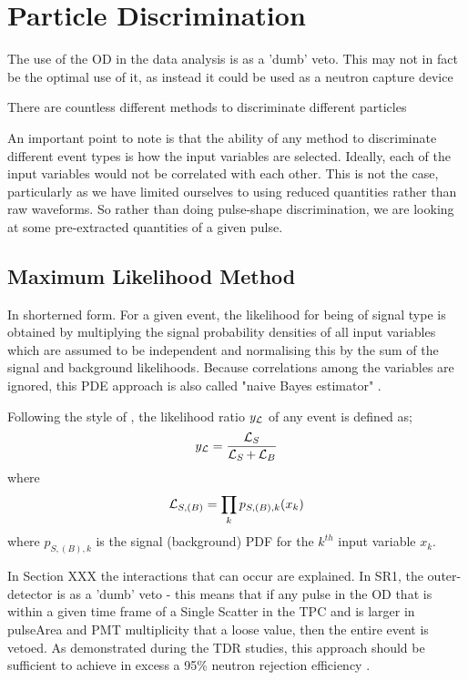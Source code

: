 \section{Particle Discrimination}
\par
The use of the OD in the data analysis is as a 'dumb' veto.
This may not in fact be the optimal use of it, as instead it could be used as a neutron capture device 

There are countless different methods to discriminate different particles


\par
An important point to note is that the ability of any method to discriminate different event types is how the input variables are selected.
Ideally, each of the input variables would not be correlated with each other.
This is not the case, particularly as we have limited ourselves to using reduced quantities rather than raw waveforms.
So rather than doing pulse-shape discrimination, we are looking at some pre-extracted quantities of a given pulse.

\subsection{Maximum Likelihood Method}
\par
In shorterned form. 
For a given event, the likelihood for being of signal type is obtained by multiplying the signal probability densities of all input variables which are assumed to be independent and normalising this by the sum of the signal and background likelihoods.
Because correlations among the variables are ignored, this PDE approach is also called "naive Bayes estimator" \cite{TMVA_ref}.

Following the style of \cite{TMVA_ref}, the likelihood ratio $y_{\operatorname{\mathcal{L}}}$ of any event is defined as;
\begin{equation}
    y_{\operatorname{\mathcal{L}}} = \frac{\operatorname{\mathcal{L}}_{S}}{\operatorname{\mathcal{L}}_{S} + \operatorname{\mathcal{L}}_{B}}
\end{equation}
where
\begin{equation}
    \operatorname{\mathcal{L}}_{S,(B)} = \prod_k p_{S,(B),k}(x_k)
\end{equation}
where $p_{S,(B),k}$ is the signal (background) PDF for the $k^{th}$ input variable $x_k$.

\par
In Section XXX the interactions that can occur are explained.
In SR1, the outer-detector is as a 'dumb' veto - this means that if any pulse in the OD that is within a given time frame of a Single Scatter in the TPC and is larger in pulseArea and PMT multiplicity that a loose value, then the entire event is vetoed.
As demonstrated during the TDR studies, this approach should be sufficient to achieve in excess a 95\% neutron rejection efficiency \cite{LZ_TechnicalDesignReview_ref}.

